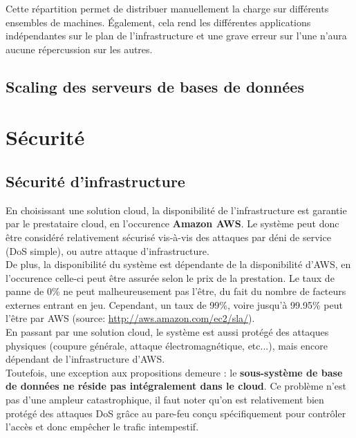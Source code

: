 Cette répartition permet de distribuer manuellement la charge sur différents
ensembles de machines. Également, cela rend les différentes applications
indépendantes sur le plan de l'infrastructure et une grave erreur sur l'une
n'aura aucune répercussion sur les autres. \\

\subsection{Scaling des serveurs de bases de données}
\label{subsec:scaling-bdd}

\section{Sécurité}
\label{sec:securite}

\subsection{Sécurité d'infrastructure}
\label{subsec:securite-infrastructure}

En choisissant une solution cloud, la disponibilité de l'infrastructure est
garantie par le prestataire cloud, en l'occurence \textbf{Amazon AWS}. Le
système peut donc être considéré relativement sécurisé vis-à-vis des attaques
par déni de service (DoS simple), ou autre attaque d'infrastructure. \\

De plus, la disponibilité du système est dépendante de la disponibilité d'AWS,
en l'occurence celle-ci peut être assurée selon le prix de la prestation. Le
taux de panne de 0\% ne peut malheureusement pas l'être, du fait du nombre de
facteurs externes entrant en jeu. Cependant, un taux de 99\%, voire jusqu'à
99.95\% peut l'être par AWS (source: \url{http://aws.amazon.com/ec2/sla/}). \\

En passant par une solution cloud, le système est aussi protégé des attaques
physiques (coupure générale, attaque électromagnétique, etc...), mais encore
dépendant de l'infrastructure d'AWS. \\

Toutefois, une exception aux propositions demeure : le \textbf{sous-système de
base de données ne réside pas intégralement dans le cloud}. Ce problème n'est
pas d'une ampleur catastrophique, il faut noter qu'on est relativement bien
protégé des attaques DoS grâce au pare-feu conçu spécifiquement pour contrôler
l'accès et donc empêcher le trafic intempestif. \\

